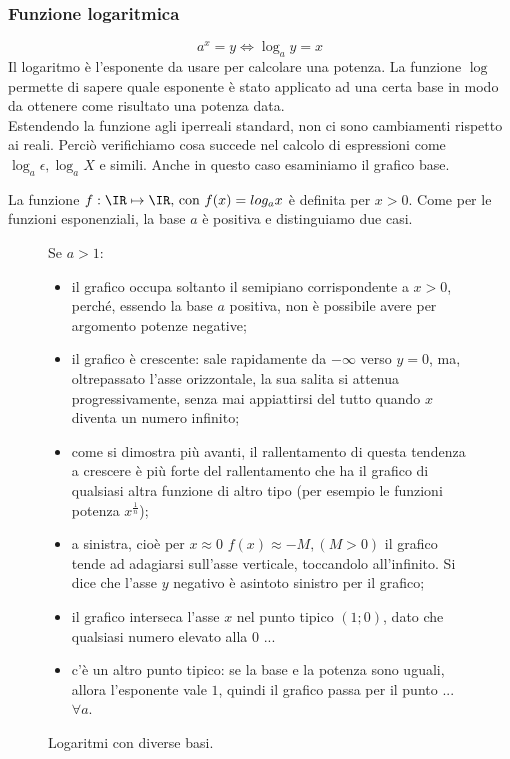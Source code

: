 \subsubsection{Funzione logaritmica}
\label{subsubsec:insnum_log}
\[
 a^x=y \Leftrightarrow \log_a{y}=x
\]
Il logaritmo è l'esponente da usare per calcolare una potenza.
La funzione \(\log\) permette di sapere quale esponente è stato applicato
ad una certa base in modo da ottenere come risultato una potenza data.\\
Estendendo la funzione agli iperreali standard, non ci sono cambiamenti rispetto 
ai reali. Perciò verifichiamo cosa succede nel calcolo di espressioni come
$\log_a \epsilon, \log_a X$ e simili. Anche in questo caso esaminiamo il
grafico base.

La funzione \(f:\IR\mapsto \IR \text{, con } f(x)= log_a x\)
è definita per \(x>0\). Come per le funzioni esponenziali, 
la base \(a\) è positiva e distinguiamo due casi.

\begin{figure}[h]
\begin{minipage}{.4\textwidth}
 \begin{inaccessibleblock}
  \logduebasi
 \end{inaccessibleblock}
\end{minipage}
\hspace{12pt}
\begin{minipage}{.6\textwidth}
Se $a>1$:
\begin{itemize} [noitemsep]
 \item 
il grafico occupa soltanto il semipiano corrispondente a $x>0$, perché,
essendo la base $a$ positiva, non è possibile avere per argomento potenze
negative;
 \item
il grafico è crescente: sale rapidamente da $-\infty$ verso $y=0$, ma, oltrepassato
l'asse orizzontale, la sua salita si attenua progressivamente, 
senza mai appiattirsi del tutto quando $x$ diventa un numero infinito; 
 \item 
come si dimostra più avanti, il rallentamento di questa tendenza a crescere
è più forte del rallentamento che ha il grafico di qualsiasi altra
funzione di altro tipo (per esempio le funzioni potenza $x^{\frac{1}{n}}$);
 \item
a sinistra, cioè per $x\approx 0$ $f(x)\approx -M, (M>0)$ il grafico tende 
ad adagiarsi sull'asse verticale, toccandolo all'infinito. Si dice che l'asse
$y$ negativo è asintoto sinistro per il grafico;
 \item
il grafico interseca l'asse $x$ nel punto tipico $(1;0)$, dato che qualsiasi numero
elevato alla 0 ...
 \item
c'è un altro punto tipico: se la base e la potenza sono uguali, allora 
l'esponente vale $1$, quindi il grafico passa per il punto ... $\forall a$.
\end{itemize}

\end{minipage}
  \caption{Logaritmi con diverse basi.} \label{fig:diversebasi}
\end{figure}

